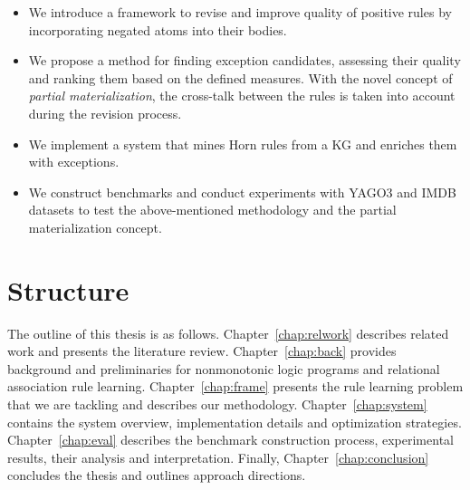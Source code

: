 \begin{itemize}
\item We introduce a framework to revise and improve quality of positive rules by incorporating negated atoms into their bodies.
\item We propose a method for finding exception candidates, assessing their quality and ranking them based on the defined measures. With the novel concept of \textit{partial materialization}, the cross-talk between the rules is taken into account during the revision process.
\item We implement a system that mines Horn rules from a KG and enriches them with exceptions.
\item We construct benchmarks and conduct experiments with YAGO3 and IMDB datasets to test the above-mentioned methodology and the partial materialization concept.
\end{itemize}

\section{Structure}

The outline of this thesis is as follows. Chapter~\ref{chap:relwork} describes related work and presents the literature review. Chapter~\ref{chap:back} provides background and preliminaries for nonmonotonic logic programs and relational association rule learning. Chapter~\ref{chap:frame} presents the rule learning problem that we are tackling and describes our methodology. Chapter~\ref{chap:system} contains the system overview, implementation details and optimization strategies. Chapter~\ref{chap:eval} describes the benchmark construction process, experimental results, their analysis and interpretation. Finally, Chapter~\ref{chap:conclusion} concludes the thesis and outlines approach directions.